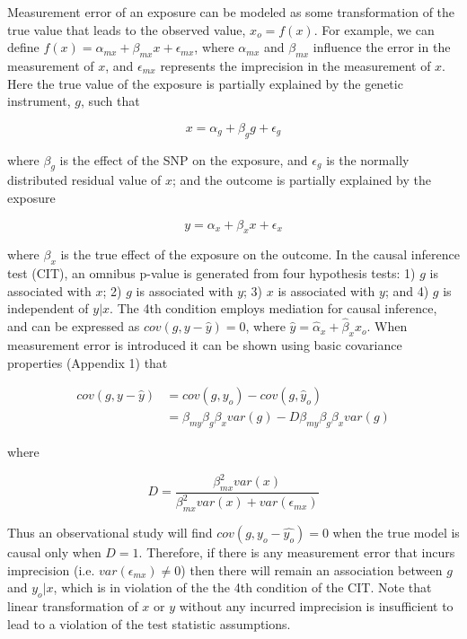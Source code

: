 \documentclass[]{article}
\begin{document}
Measurement error of an exposure can be modeled as some transformation
of the true value that leads to the observed value, \(x_o = f(x)\). For
example, we can define
\(f(x) = \alpha_{mx} + \beta_{mx} x + \epsilon_{mx}\), where
\(\alpha_{mx}\) and \(\beta_{mx}\) influence the error in the
measurement of \(x\), and \(\epsilon_{mx}\) represents the imprecision
in the measurement of \(x\). Here the true value of the exposure is
partially explained by the genetic instrument, \(g\), such that

\[
x = \alpha_g + \beta_g g + \epsilon_g
\]

where \(\beta_g\) is the effect of the SNP on the exposure, and
\(\epsilon_g\) is the normally distributed residual value of \(x\); and
the outcome is partially explained by the exposure

\[
y = \alpha_x + \beta_x x + \epsilon_x
\]

where \(\beta_x\) is the true effect of the exposure on the outcome. In
the causal inference test (CIT), an omnibus p-value is generated from
four hypothesis tests: 1) \(g\) is associated with \(x\); 2) \(g\) is
associated with \(y\); 3) \(x\) is associated with \(y\); and 4) \(g\)
is independent of \(y|x\). The 4th condition employs mediation for
causal inference, and can be expressed as \(cov(g, y - \hat{y}) = 0\),
where \(\hat{y} = \hat{\alpha}_x + \hat{\beta}_x x_o\). When measurement
error is introduced it can be shown using basic covariance properties
(Appendix 1) that

\[
\begin{aligned}
cov(g, y - \hat{y}) & = cov(g, y_o) - cov(g, \hat{y}_o)  \\
                    & = \beta_{my} \beta_g \beta_x var(g) - D \beta_{my} \beta_g \beta_x var(g)
\end{aligned}
\]

where

\[
D = \frac{\beta^2_{mx} var(x)} {\beta^2_{mx} var(x) + var(\epsilon_{mx})}
\]

Thus an observational study will find \(cov(g, y_o - \hat{y_o}) = 0\)
when the true model is causal only when \(D = 1\). Therefore, if there
is any measurement error that incurs imprecision (i.e.
\(var(\epsilon_{mx}) \neq 0\)) then there will remain an association
between \(g\) and \(y_o | x\), which is in violation of the the 4th
condition of the CIT. Note that linear transformation of \(x\) or \(y\)
without any incurred imprecision is insufficient to lead to a violation
of the test statistic assumptions.
\end{document}
